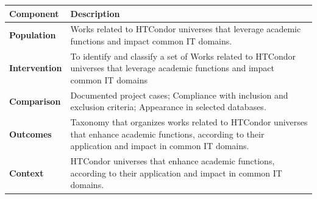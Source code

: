 \begin{table}
	{\begin{tabular}{p{1.4cm}p{6.4cm}} \toprule
			\textbf{Component}    & \textbf{Description}                                                                                                                                         \\
			\midrule
			\textbf{Population}   & Works related to HTCondor universes that leverage academic functions and impact common IT domains.                                                           \\
			\textbf{Intervention} & To identify and classify a set of Works related to HTCondor universes that leverage academic functions and impact common IT domains                          \\
			\textbf{Comparison}   & Documented project cases; Compliance with inclusion and exclusion criteria; Appearance in selected databases.                                                \\
			\textbf{Outcomes}     & Taxonomy that organizes works related to HTCondor universes that enhance academic functions, according to their application and impact in common IT domains. \\
			\textbf{Context}      & HTCondor universes that enhance academic functions, according to their application and impact in common IT domains.                                          \\
			\bottomrule
		\end{tabular}}
	\label{table:PICOC}
\end{table}

